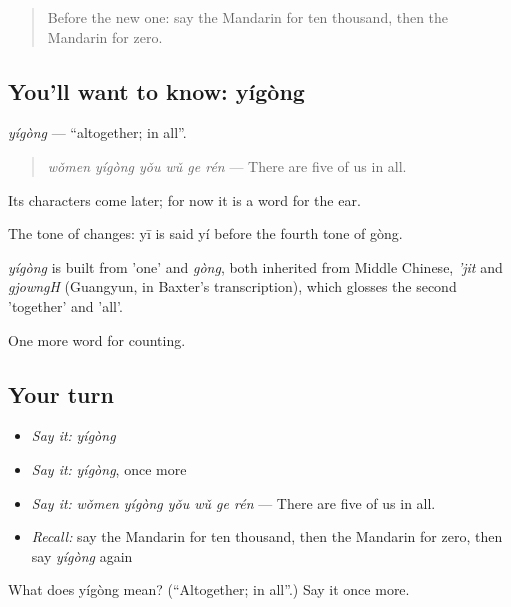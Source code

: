 \begin{quote}
Before the new one: say the Mandarin for ten thousand, then the Mandarin for zero.
\end{quote}

\subsection*{You'll want to know: yígòng}
\emph{yígòng} — \textquotedblleft{}altogether; in all\textquotedblright{}.

\begin{quote}
\emph{wǒmen yígòng yǒu wǔ ge rén} — There are five of us in all.
\end{quote}

Its characters come later; for now it is a word for the ear.

The tone of  changes: yī is said yí before the fourth tone of gòng.

\begin{cousinweb}
\emph{yígòng} is built from  'one' and \emph{gòng}, both inherited from Middle Chinese, \emph{'jit} and \emph{gjowngH} (Guangyun, in Baxter's transcription), which glosses the second 'together' and 'all'.
\end{cousinweb}

\begin{grammarlens}[title={What you've built}]
One more word for counting.
\end{grammarlens}

\subsection*{Your turn}
\begin{itemize}
\raggedright
  \item \emph{Say it:} \emph{yígòng}
  \item \emph{Say it:} \emph{yígòng}, once more
  \item \emph{Say it:} \emph{wǒmen yígòng yǒu wǔ ge rén} — There are five of us in all.
  \item \emph{Recall:} say the Mandarin for ten thousand, then the Mandarin for zero, then say \emph{yígòng} again
\end{itemize}

\begin{tcolorbox}[breakable,colback=teal!4,colframe=teal!35!black,title={Before you move on}]
What does yígòng mean? (\textquotedblleft{}Altogether; in all\textquotedblright{}.) Say it once more.
\end{tcolorbox}
